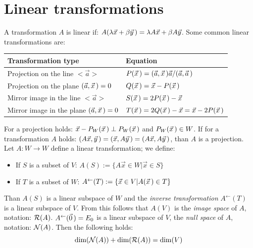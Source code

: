 \documentclass[twoside]{report}
\begin{document}
\section{Linear transformations}
A transformation $A$ is linear if:
$A(\lambda\vec{x}+\beta\vec{y}\,)=\lambda A\vec{x}+\beta A\vec{y}$.
\npar
Some common linear transformations are:
\begin{center}
\begin{tabular}{||p{7cm}|p{6cm}||}
\hline
\bf Transformation type&\bf Equation\\
\hline
\hline
Projection on the line $<\vec{a}>$             &$P(\vec{x}\,)=(\vec{a},\vec{x}\,)\vec{a}/(\vec{a},\vec{a}\,)$\\
Projection on the plane $(\vec{a},\vec{x}\,)=0$ &$Q(\vec{x}\,)=\vec{x}-P(\vec{x}\,)$\\
Mirror image in the line $<\vec{a}>$             &$S(\vec{x}\,)=2P(\vec{x}\,)-\vec{x}$\\
Mirror image in the plane $(\vec{a},\vec{x}\,)=0$&$T(\vec{x}\,)=2Q(\vec{x}\,)-\vec{x}=\vec{x}-2P(\vec{x}\,)$\\
\hline
\end{tabular}
\end{center}
For a projection holds: $\vec{x}-P_W(\vec{x}\,)\perp P_W(\vec{x}\,)$ and
$P_W(\vec{x}\,)\in W$.
\npar
If for a transformation $A$ holds: $(A\vec{x},\vec{y}\,)=(\vec{x},A\vec{y}\,)=(A\vec{x},A\vec{y}\,)$,
than $A$ is a projection.
\npar
Let $A:W\rightarrow W$ define a linear transformation; we define:
\begin{itemize}
\item If $S$ is a subset of $V$: $A(S):=\{A\vec{x}\in W|\vec{x}\in S\}$
\item If $T$ is a subset of $W$: $A^\leftarrow(T):=\{\vec{x}\in V|A(\vec{x}\,)\in T\}$
\end{itemize}
Than $A(S)$ is a linear subspace of $W$ and the {\it inverse transformation}
$A^\leftarrow(T)$ is a linear subspace of $V$. From this follows that $A(V)$ is
the {\it image space} of $A$, notation: ${\cal R}(A)$. $A^\leftarrow(\vec{0}\,)=E_0$
is a linear subspace of $V$, the {\it null space} of $A$, notation:
${\cal N}(A)$. Then the following holds:
\[
{\rm dim}({\cal N}(A))+{\rm dim}({\cal R}(A))={\rm dim}(V)
\]
\end{document}

